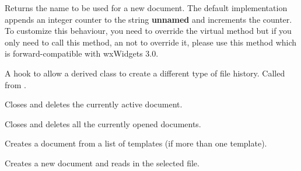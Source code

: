 \label{wxdocmanagermakenewdocumentname}


Returns the name to be used for a new document. The default implementation
appends an integer counter to the string {\bf unnamed} and increments the
counter. To customize this behaviour, you need to override the virtual 
 method but if you
only need to call this method, an not to override it, please use this method
which is forward-compatible with wxWidgets 3.0.



\label{wxdocmanageroncreatefilehistory}


A hook to allow a derived class to create a different type of file history. Called
from .


\label{wxdocmanageronfileclose}


Closes and deletes the currently active document.


\label{wxdocmanageronfilecloseall}


Closes and deletes all the currently opened documents.


\label{wxdocmanageronfilenew}


Creates a document from a list of templates (if more than one template).


\label{wxdocmanageronfileopen}


Creates a new document and reads in the selected file.


\label{wxdocmanageronfilerevert}


